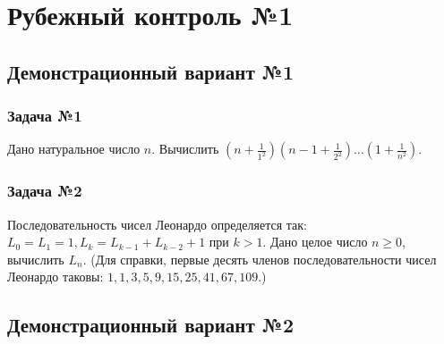 \documentclass[12pt,a5paper,landscape]{article}
\begin{document}
\parindent=1cm
\pagestyle{empty}



\clearpage
\section*{Рубежный контроль №1}
\subsection*{Демонстрационный вариант №1}
\subsubsection*{Задача №1}
Дано натуральное число $n$. Вычислить $(n + \frac{1}{1^2})(n-1 + \frac{1}{2^2}) \ldots (1 + \frac{1}{n^2})$.
\subsubsection*{Задача №2}
Последовательность чисел Леонардо определяется так: $L_0 = L_1 = 1, L_k = L_{k-1} + L_{k-2} + 1$ при $k > 1$. Дано целое число $n \ge 0$, вычислить $L_n$. (Для справки, первые десять членов последовательности чисел Леонардо таковы: $1, 1, 3, 5, 9, 15, 25, 41, 67, 109$.)

\clearpage
\subsection*{Демонстрационный вариант №2}
\end{document}
